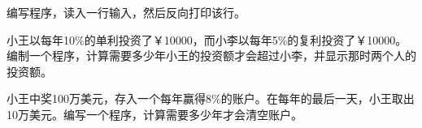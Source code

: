\begin{frame}

\end{frame}

\begin{frame}[fragile]
\begin{free}[问题14]{}
  编写程序，读入一行输入，然后反向打印该行。
\end{free}
\end{frame}

\begin{frame}

\end{frame}


\begin{frame}[fragile]
\begin{free}[问题15]{}
 小王以每年10\%的单利投资了￥10000，而小李以每年5\%的复利投资了￥10000。编制一个程序，计算需要多少年小王的投资额才会超过小李，并显示那时两个人的投资额。
\end{free}
\end{frame}

\begin{frame}

\end{frame}


\begin{frame}[fragile]
\begin{free}[问题16]{}
  小王中奖100万美元，存入一个每年赢得8\%的账户。在每年的最后一天，小王取出10万美元。编写一个程序，计算需要多少年才会清空账户。
\end{free}
\end{frame}


\begin{frame}

\end{frame}
